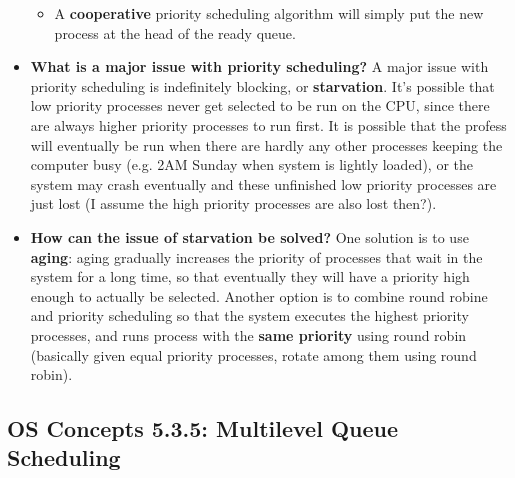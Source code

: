 \documentclass[12pt]{article}
\begin{document}
\begin{itemize}
\begin{itemize}
            \item A \textbf{cooperative} priority scheduling algorithm will simply put the new process at the head of the ready queue.
        \end{itemize}
    \item \textbf{What is a major issue with priority scheduling?} A major issue with priority scheduling is indefinitely blocking, or \textbf{starvation}. It's possible that low priority processes never get selected to be run on the CPU, since there are always higher priority processes to run first. It is possible that the profess will eventually be run when there are hardly any other processes keeping the computer busy (e.g. 2AM Sunday when system is lightly loaded), or the system may crash eventually and these unfinished low priority processes are just lost (I assume the high priority processes are also lost then?).
    \item \textbf{How can the issue of starvation be solved?} One solution is to use \textbf{aging}: aging gradually increases the priority of processes that wait in the system for a long time, so that eventually they will have a priority high enough to actually be selected. Another option is to combine round robine and priority scheduling so that the system executes the highest priority processes, and runs process with the \textbf{same priority} using round robin (basically given equal priority processes, rotate among them using round robin).
\end{itemize}

\subsection*{OS Concepts 5.3.5: Multilevel Queue Scheduling}
\end{document}

